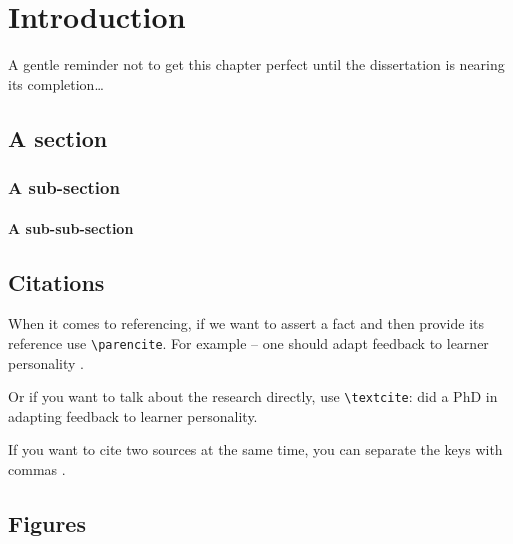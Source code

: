 \chapter{Introduction} \label{chap:intro}
A gentle reminder not to get this chapter perfect until the dissertation is nearing its completion\ldots

\section{A section}

\subsection{A sub-section}

\subsubsection{A sub-sub-section}



\section{Citations}

When it comes to referencing, if we want to assert a fact and then provide its reference use \verb!\parencite!. For example -- one should adapt feedback to learner personality \parencite{dennis2016adapting}.

Or if you want to talk about the research directly, use \verb!\textcite!: \textcite{dennis2016adapting} did a PhD in adapting feedback to learner personality. 

If you want to cite two sources at the same time, you can separate the keys with commas \parencite{dennis2016adapting,cle12}.

\section{Figures}

